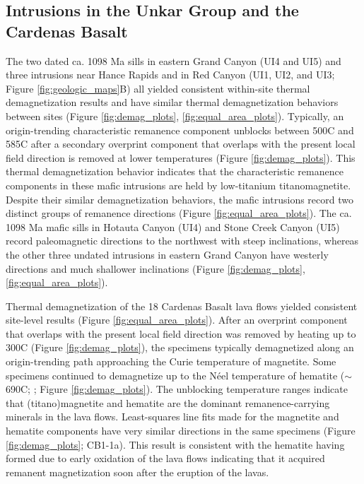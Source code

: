 \subsection{Intrusions in the Unkar Group and the Cardenas Basalt}
The two dated ca. 1098 Ma sills in eastern Grand Canyon (UI4 and UI5) and three intrusions near Hance Rapids and in Red Canyon (UI1, UI2, and UI3; Figure \ref{fig:geologic_maps}B) all yielded consistent within-site thermal demagnetization results and have similar thermal demagnetization behaviors between sites (Figure \ref{fig:demag_plots}, \ref{fig:equal_area_plots}). Typically, an origin-trending characteristic remanence component unblocks between 500\textdegree C and 585\textdegree C after a secondary overprint component that overlaps with the present local field direction is removed at lower temperatures (Figure \ref{fig:demag_plots}). This thermal demagnetization behavior indicates that the characteristic remanence components in these mafic intrusions are held by low-titanium titanomagnetite. Despite their similar demagnetization behaviors, the mafic intrusions record two distinct groups of remanence directions (Figure \ref{fig:equal_area_plots}). The ca. 1098 Ma mafic sills in Hotauta Canyon (UI4) and Stone Creek Canyon (UI5) record paleomagnetic directions to the northwest with steep inclinations, whereas the other three undated intrusions in eastern Grand Canyon have westerly directions and much shallower inclinations (Figure \ref{fig:demag_plots}, \ref{fig:equal_area_plots}). 

Thermal demagnetization of the 18 Cardenas Basalt lava flows yielded consistent site-level results (Figure \ref{fig:equal_area_plots}). After an overprint component that overlaps with the present local field direction was removed by heating up to 300\textdegree C (Figure \ref{fig:demag_plots}), the specimens typically demagnetized along an origin-trending path approaching the Curie temperature of magnetite. Some specimens continued to demagnetize up to the N\'eel temperature of hematite ($\sim$690\textdegree C; \cite{Ozdemir2006a}; Figure \ref{fig:demag_plots}). The unblocking temperature ranges indicate that (titano)magnetite and hematite are the dominant remanence-carrying minerals in the lava flows. Least-squares line fits made for the magnetite and hematite components have very similar directions in the same specimens (Figure \ref{fig:demag_plots}; CB1-1a). This result is consistent with the hematite having formed due to early oxidation of the lava flows indicating that it acquired remanent magnetization soon after the eruption of the lavas. 

